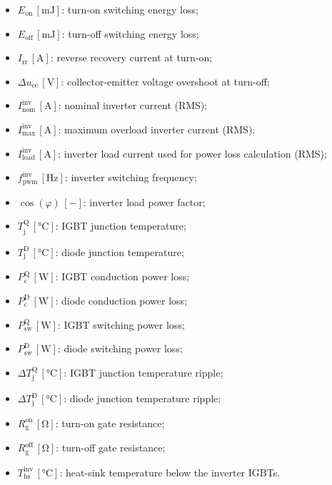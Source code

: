 \documentclass[12pt,a4paper,oneside]{book}
\begin{document}
\begin{itemize}
		\item[--] $E_\text{on}$\,$\left[\si{\milli\joule}\right]$: turn-on switching energy loss;
		\item[--] $E_\text{off}$\,$\left[\si{\milli\joule}\right]$: turn-off switching energy loss;
		\item[--] $I_\text{rr}$\,$\left[\si{\ampere}\right]$: reverse recovery current at turn-on;
		\item[--] $\Delta u_\text{ce}$\,$\left[\si{\volt}\right]$: collector-emitter voltage overshoot at turn-off;
		\item[--] $I_\text{nom}^\text{inv}$\,$\left[\si{\ampere}\right]$: nominal inverter current (RMS);
		\item[--] $I_\text{max}^\text{inv}$\,$\left[\si{\ampere}\right]$: maximum overload inverter current (RMS);
		\item[--] $I_\text{load}^\text{inv}$\,$\left[\si{\ampere}\right]$: inverter load current used for power loss calculation (RMS);
		\item[--] $f_\text{pwm}^\text{inv}$\,$\left[\si{\hertz}\right]$: inverter switching frequency;
		\item[--] $\cos(\varphi)$\,$\left[-\right]$: inverter load power factor;
		\item[--] $T_\text{j}^\text{Q}$\,$\left[\si{\celsius}\right]$: IGBT junction temperature;
		\item[--] $T_\text{j}^\text{D}$\,$\left[\si{\celsius}\right]$: diode junction temperature;
		\item[--] $P_\text{c}^\text{Q}$\,$\left[\si{\watt}\right]$: IGBT conduction power loss;
		\item[--] $P_\text{c}^\text{D}$\,$\left[\si{\watt}\right]$: diode conduction power loss;
		\item[--] $P_\text{sw}^\text{Q}$\,$\left[\si{\watt}\right]$: IGBT switching power loss;
		\item[--] $P_\text{sw}^\text{D}$\,$\left[\si{\watt}\right]$: diode switching power loss;
		\item[--] $\Delta T_\text{j}^\text{Q}$\,$\left[\si{\celsius}\right]$: IGBT junction temperature ripple;
		\item[--] $\Delta T_\text{j}^\text{D}$\,$\left[\si{\celsius}\right]$: diode junction temperature ripple;
		\item[--] $R_\text{g}^\text{on}$\,$\left[\si{\ohm}\right]$: turn-on gate resistance;
		\item[--] $R_\text{g}^\text{off}$\,$\left[\si{\ohm}\right]$: turn-off gate resistance;
		\item[--] $T_\text{hs}^\text{inv}$\,$\left[\si{\celsius}\right]$: heat-sink temperature below the inverter IGBTs.
	\end{itemize}
	\newpage
\end{document}
